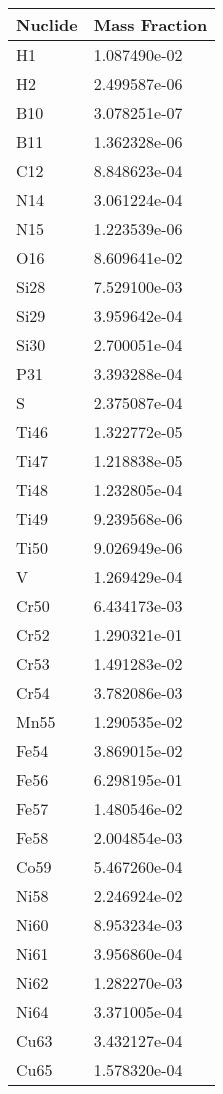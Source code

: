 \begin{centering}
\begin{longtable}[ht!]
\caption{Table showing the isotopic description of material EPP2L}
\label{table:material_EPP2L}
\end{longtable}\clearpage

\begin{longtable}[ht!]             
{ p{} | p{} } 
\hline
Nuclide & Mass Fraction\\
\hline
H1 & 1.087490e-02\\
H2 & 2.499587e-06\\
B10 & 3.078251e-07\\
B11 & 1.362328e-06\\
C12 & 8.848623e-04\\
N14 & 3.061224e-04\\
N15 & 1.223539e-06\\
O16 & 8.609641e-02\\
Si28 & 7.529100e-03\\
Si29 & 3.959642e-04\\
Si30 & 2.700051e-04\\
P31 & 3.393288e-04\\
S & 2.375087e-04\\
Ti46 & 1.322772e-05\\
Ti47 & 1.218838e-05\\
Ti48 & 1.232805e-04\\
Ti49 & 9.239568e-06\\
Ti50 & 9.026949e-06\\
V & 1.269429e-04\\
Cr50 & 6.434173e-03\\
Cr52 & 1.290321e-01\\
Cr53 & 1.491283e-02\\
Cr54 & 3.782086e-03\\
Mn55 & 1.290535e-02\\
Fe54 & 3.869015e-02\\
Fe56 & 6.298195e-01\\
Fe57 & 1.480546e-02\\
Fe58 & 2.004854e-03\\
Co59 & 5.467260e-04\\
Ni58 & 2.246924e-02\\
Ni60 & 8.953234e-03\\
Ni61 & 3.956860e-04\\
Ni62 & 1.282270e-03\\
Ni64 & 3.371005e-04\\
Cu63 & 3.432127e-04\\
Cu65 & 1.578320e-04\\

\end{longtable}
\end{centering}

